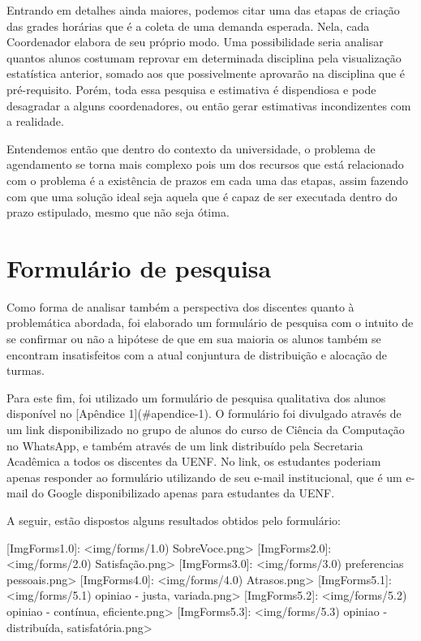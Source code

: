     Entrando em detalhes ainda maiores, podemos citar uma das etapas de criação das grades horárias que é a coleta de uma demanda esperada. Nela, cada Coordenador elabora de seu próprio modo. Uma possibilidade seria analisar quantos alunos costumam reprovar em determinada disciplina pela visualização estatística anterior, somado aos que possivelmente aprovarão na disciplina que é pré-requisito. Porém, toda essa pesquisa e estimativa é dispendiosa e pode desagradar a alguns coordenadores, ou então gerar estimativas incondizentes com a realidade.

    Entendemos então que dentro do contexto da universidade, o problema de agendamento se torna mais complexo pois um dos recursos que está relacionado com o problema é a existência de prazos em cada uma das etapas, assim fazendo com que uma solução ideal seja aquela que é capaz de ser executada dentro do prazo estipulado, mesmo que não seja ótima.

\section{Formulário de pesquisa} %


    Como forma de analisar também a perspectiva dos discentes quanto à problemática abordada, foi elaborado um formulário de pesquisa com o intuito de se confirmar ou não a hipótese de que em sua maioria os alunos também se encontram insatisfeitos com a atual conjuntura de distribuição e alocação de turmas.

    Para este fim, foi utilizado um formulário de pesquisa qualitativa dos alunos disponível no [Apêndice 1](#apendice-1). O formulário foi divulgado através de um link disponibilizado no grupo de alunos do curso de Ciência da Computação no WhatsApp, e também através de um link distribuído pela Secretaria Acadêmica a todos os discentes da UENF. No link, os estudantes poderiam apenas responder ao formulário utilizando de seu e-mail institucional, que é um e-mail do Google disponibilizado apenas para estudantes da UENF.

    A seguir, estão dispostos alguns resultados obtidos pelo formulário:

    [ImgForms1.0]: <img/forms/1.0) SobreVoce.png>
    [ImgForms2.0]: <img/forms/2.0) Satisfação.png>
    [ImgForms3.0]: <img/forms/3.0) preferencias pessoais.png>
    [ImgForms4.0]: <img/forms/4.0) Atrasos.png>
    [ImgForms5.1]: <img/forms/5.1) opiniao - justa, variada.png>
    [ImgForms5.2]: <img/forms/5.2) opiniao - contínua, eficiente.png>
    [ImgForms5.3]: <img/forms/5.3) opiniao - distribuída, satisfatória.png>

